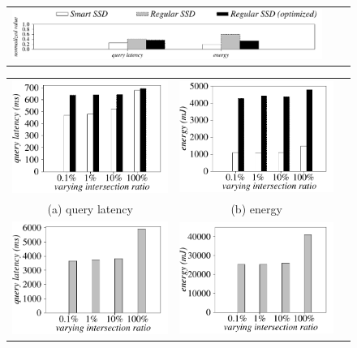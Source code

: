   \begin{figure}[tbp]
  \centering
    \begin{tabular}{ccc}
 \includegraphics[width=0.95\columnwidth]{figures/banner.pdf}
\end{tabular}
\renewcommand{\tabcolsep}{0.1mm}
  \begin{tabular}{ccc}
 \includegraphics[width=0.5\columnwidth]{figures/Intersection-time-VaryInterRatio-equal2-eps-converted-to.pdf}&
  \includegraphics[width=0.5\columnwidth]{figures/Intersection-energy-VaryInterRatio-equal2-eps-converted-to.pdf}\\
  (a) query latency & (b) energy\\
   \includegraphics[width=0.5\columnwidth]{figures/Intersection-time-VaryInterRatio-equal1-eps-converted-to.pdf}&
  \includegraphics[width=0.5\columnwidth]{figures/Intersection-energy-VaryInterRatio-equal1-eps-converted-to.pdf}\\

\end{tabular}
\end{figure}
